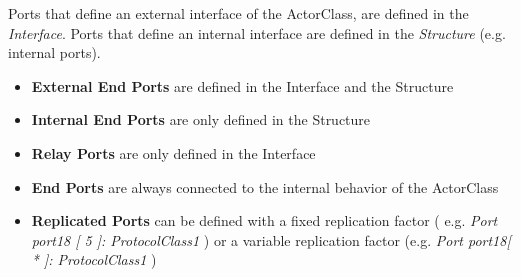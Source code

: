 Ports that define an external interface of the ActorClass, are defined in the \textit{Interface}. Ports that define an internal interface are defined in the \textit{Structure} (e.g. internal ports).
\begin{itemize}
\item \textbf{External End Ports} are defined in the Interface and the Structure
\item \textbf{Internal End Ports} are only defined in the Structure
\item \textbf{Relay Ports} are only defined in the Interface
\item \textbf{End Ports} are always connected to the internal behavior of the ActorClass
\item \textbf{Replicated Ports} can be defined with a fixed replication factor ( e.g. \textit{Port port18 [ 5 ]: ProtocolClass1} ) or a variable replication factor (e.g. \textit{Port port18[ * ]: ProtocolClass1} )
\end{itemize}
